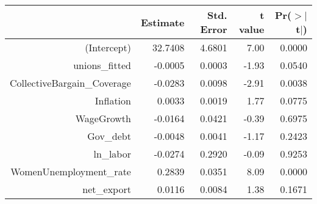 \begin{table}[ht]
\centering
\begin{tabular}{rrrrr}
  \hline
 & Estimate & Std. Error & t value & Pr($>$$|$t$|$) \\ 
  \hline
(Intercept) & 32.7408 & 4.6801 & 7.00 & 0.0000 \\ 
  unions\_fitted & -0.0005 & 0.0003 & -1.93 & 0.0540 \\ 
  CollectiveBargain\_Coverage & -0.0283 & 0.0098 & -2.91 & 0.0038 \\ 
  Inflation & 0.0033 & 0.0019 & 1.77 & 0.0775 \\ 
  WageGrowth & -0.0164 & 0.0421 & -0.39 & 0.6975 \\ 
  Gov\_debt & -0.0048 & 0.0041 & -1.17 & 0.2423 \\ 
  ln\_labor & -0.0274 & 0.2920 & -0.09 & 0.9253 \\ 
  WomenUnemployment\_rate & 0.2839 & 0.0351 & 8.09 & 0.0000 \\ 
  net\_export & 0.0116 & 0.0084 & 1.38 & 0.1671 \\ 
   \hline
\end{tabular}
\end{table}
